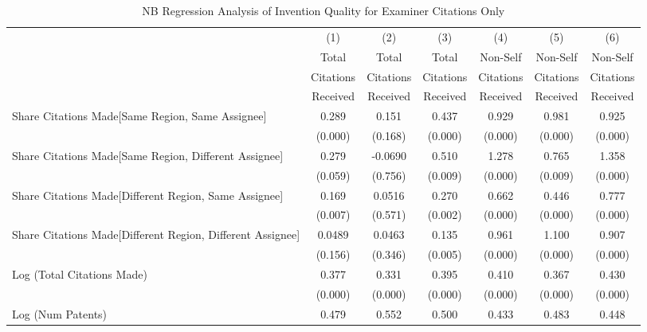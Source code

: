 {
\begin{longtable}{l*{6}{c}}
\caption{NB Regression Analysis of Invention Quality for Examiner Citations Only \label{e.model123192021}}\\
\hline\hline\endfirsthead\hline\endhead\hline\endfoot\endlastfoot
                &\multicolumn{1}{c}{(1)}&\multicolumn{1}{c}{(2)}&\multicolumn{1}{c}{(3)}&\multicolumn{1}{c}{(4)}&\multicolumn{1}{c}{(5)}&\multicolumn{1}{c}{(6)}\\
                &\multicolumn{1}{c}{Total}&\multicolumn{1}{c}{Total}&\multicolumn{1}{c}{Total}&\multicolumn{1}{c}{Non-Self}&\multicolumn{1}{c}{Non-Self}&\multicolumn{1}{c}{Non-Self}\\
                &\multicolumn{1}{c}{Citations}&\multicolumn{1}{c}{Citations}&\multicolumn{1}{c}{Citations}&\multicolumn{1}{c}{Citations}&\multicolumn{1}{c}{Citations}&\multicolumn{1}{c}{Citations}\\
                 &\multicolumn{1}{c}{Received}&\multicolumn{1}{c}{Received}&\multicolumn{1}{c}{Received}&\multicolumn{1}{c}{Received}&\multicolumn{1}{c}{Received}&\multicolumn{1}{c}{Received}\\
\hline
Share Citations Made[Same Region, Same Assignee]&    0.289&    0.151&    0.437&    0.929&    0.981&    0.925\\
                &  (0.000)&  (0.168)&  (0.000)&  (0.000)&  (0.000)&  (0.000)\\
Share Citations Made[Same Region, Different Assignee]&    0.279&  -0.0690&    0.510&    1.278&    0.765&    1.358\\
                &  (0.059)&  (0.756)&  (0.009)&  (0.000)&  (0.009)&  (0.000)\\
Share Citations Made[Different Region, Same Assignee]&    0.169&   0.0516&    0.270&    0.662&    0.446&    0.777\\
                &  (0.007)&  (0.571)&  (0.002)&  (0.000)&  (0.000)&  (0.000)\\
Share Citations Made[Different Region, Different Assignee]&   0.0489&   0.0463&    0.135&    0.961&    1.100&    0.907\\
                &  (0.156)&  (0.346)&  (0.005)&  (0.000)&  (0.000)&  (0.000)\\
Log (Total Citations Made)&    0.377&    0.331&    0.395&    0.410&    0.367&    0.430\\
                &  (0.000)&  (0.000)&  (0.000)&  (0.000)&  (0.000)&  (0.000)\\
Log (Num Patents)&    0.479&    0.552&    0.500&    0.433&    0.483&    0.448\\

\end{longtable}}
